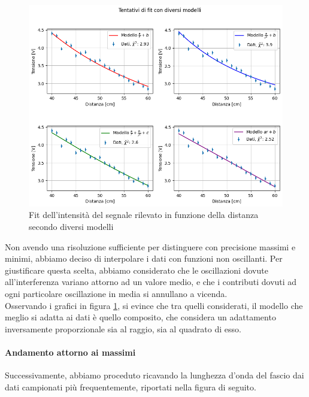 \documentclass[letterpaper,12pt]{article}
\begin{document}
\begin{figure}[h!]
	\centering
	\includegraphics[width = \textwidth]{fit_distanza_vari_modelli.png}
	\caption{Fit dell'intensità del segnale rilevato in funzione della distanza secondo diversi modelli}
	\label{fig:fit_distanza_vari_modelli}
\end{figure}

Non avendo una risoluzione sufficiente per distinguere con precisione massimi e minimi, abbiamo deciso di interpolare
i dati con funzioni non oscillanti. Per giustificare questa scelta, abbiamo considerato che le oscillazioni dovute all'interferenza
variano attorno ad un valore medio, e che i contributi dovuti ad ogni particolare oscillazione in media si annullano a vicenda.\\
Osservando i grafici in figura \ref{fig:fit_distanza_vari_modelli}, si evince che tra quelli considerati, il modello che meglio si adatta
ai dati è quello composito, che considera un adattamento inversamente proporzionale sia al raggio, sia al quadrato di esso.\\



\newpage
\paragraph*{Andamento attorno ai massimi}
Successivamente, abbiamo proceduto ricavando la lunghezza d'onda del fascio dai dati campionati più frequentemente, riportati nella figura di seguito.
\end{document}
